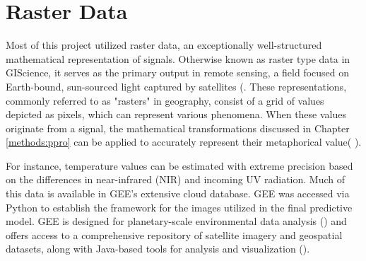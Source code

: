 \section{Raster Data} \label{tmas:satdat} Most of this project utilized raster data, an exceptionally well-structured mathematical representation of signals. Otherwise known as raster type data in GIScience, it serves as the primary output in remote sensing, a field focused on Earth-bound, sun-sourced light captured by satellites (\cite{jensen2007}. These representations, commonly referred to as "rasters" in geography, consist of a grid of values depicted as pixels, which can represent various phenomena. When these values originate from a signal, the mathematical transformations discussed in Chapter \ref{methods:ppro} can be applied to accurately represent their metaphorical value( \cite{jensen2007}). 

For instance, temperature values can be estimated with extreme precision based on the differences in near-infrared (NIR) and incoming UV radiation. Much of this data is available in GEE's extensive cloud database. GEE was accessed via Python to establish the framework for the images utilized in the final predictive model. GEE is designed for planetary-scale environmental data analysis (\cite{gharibvand_changes_2023}) and offers access to a comprehensive repository of satellite imagery and geospatial datasets, along with Java-based tools for analysis and visualization (\cite{gorelick_google_2017}). 

